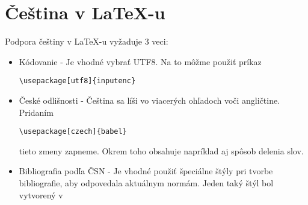 \documentclass[a4paper, 11pt] {article}
\begin{document}
\section{Čeština v \LaTeX-u}
Podpora češtiny v \LaTeX-u vyžaduje 3 veci:
\begin{itemize}
\item Kódovanie - Je vhodné vybrať UTF8. Na to môžme použiť príkaz \begin{verbatim}\usepackage[utf8]{inputenc}
\end{verbatim}
\item České odlišnosti - Čeština sa líši vo viacerých ohľadoch voči angličtine. Pridaním 
\begin{verbatim}
\usepackage[czech]{babel}
\end{verbatim}
tieto zmeny zapneme. Okrem toho obsahuje napríklad aj spôsob delenia slov.
\item Bibliografia podľa ČSN - Je vhodné použiť špeciálne štýly pri tvorbe bibliografie, aby odpovedala aktuálnym normám. Jeden taký štýl bol vytvorený v \cite{czplain_bp}
\end{itemize} 



\newpage
\renewcommand{\refname}{Referencie}

\end{document}

